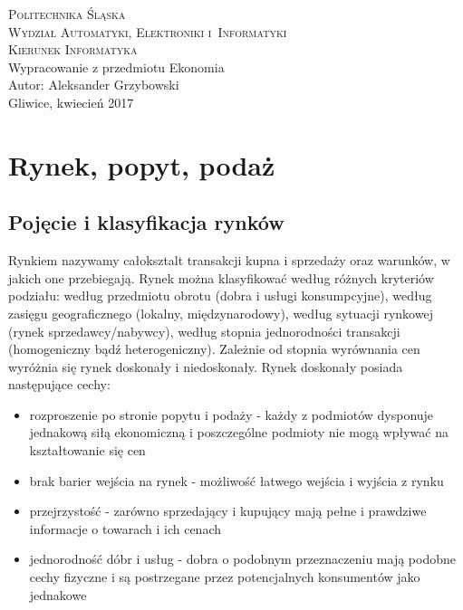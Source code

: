 \documentclass[12pt]{extarticle}
\begin{document}
\begin{titlepage}
    \begin{center}
        \textsc{\LARGE{Politechnika Śląska}}\\[0.5cm]
        \textsc{\LARGE{Wydział Automatyki, Elektroniki i~Informatyki}}\\[0.5cm]
        \textsc{\LARGE{Kierunek Informatyka}}\\[5.5cm]
        \LARGE{Wypracowanie z przedmiotu Ekonomia}\\[1cm]
        \LARGE{Autor: Aleksander Grzybowski}\\[1cm]
        \LARGE{Gliwice, kwiecień 2017}\\[1cm]
    \end{center}
\end{titlepage}



\section{Rynek, popyt, podaż}

\subsection{Pojęcie i klasyfikacja rynków}

Rynkiem nazywamy całoksztalt transakcji kupna i sprzedaży oraz warunków, w jakich one przebiegają. Rynek można klasyfikować według różnych kryteriów podziału: według przedmiotu obrotu (dobra i usługi konsumpcyjne), według zasięgu geograficznego (lokalny, międzynarodowy), według sytuacji rynkowej (rynek sprzedawcy/nabywcy), według stopnia jednorodności transakcji (homogeniczny bądź heterogeniczny). Zależnie od stopnia wyrównania cen wyróżnia się rynek doskonały i niedoskonały. Rynek doskonały posiada następujące cechy:

\begin{itemize}
	\item rozproszenie po stronie popytu i podaży - każdy z podmiotów dysponuje jednakową siłą ekonomiczną i poszczególne podmioty nie mogą wpływać na kształtowanie się cen
	\item brak barier wejścia na rynek - możliwość łatwego wejścia i wyjścia z rynku
	\item przejrzystość - zarówno sprzedający i kupujący mają pełne i prawdziwe informacje o towarach i ich cenach
	\item jednorodność dóbr i usług - dobra o podobnym przeznaczeniu mają podobne cechy fizyczne i są postrzegane przez potencjalnych konsumentów jako jednakowe
\end{itemize}
\end{document}

